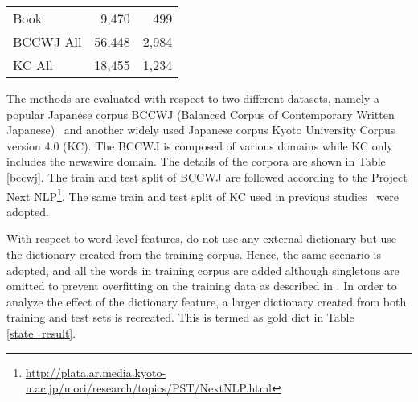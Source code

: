 \documentclass[11pt,letterpaper]{article}
\begin{document}
\begin{table}[t]
\begin{center}
\begin{tabular}{p{45mm} rr}
    Book& 9,470&499 \\
    BCCWJ All  &56,448 &2,984 \\  \hline
    KC All &18,455 & 1,234  \\                                                                                                                                                                                                                                                                                                                                                                   
    \bottomrule                                                                                                                                               
    \end{tabular}                                                                                                                                                                                                                                                                                                           
    \end{center}                                                                                                                                                                                                                                                                                                            
 \end{table}  

The methods are evaluated with respect to two different datasets, namely a popular Japanese corpus BCCWJ (Balanced Corpus of Contemporary Written Japanese)~\cite{maekawa2014balanced} and another widely used Japanese corpus Kyoto University Corpus version 4.0 (KC). 
The BCCWJ is composed of various domains while KC only includes the newswire domain. The details of the corpora are shown in Table \ref{bccwj}.  
The train and test split of BCCWJ are followed according to the Project Next NLP\footnote{\url{http://plata.ar.media.kyoto-u.ac.jp/mori/research/topics/PST/NextNLP.html}}. 
The same train and test split of KC used in previous studies~\cite{kudo-yamamoto-matsumoto:2004:EMNLP,uchimoto2001unknown} were adopted.

With respect to word-level features,
{} do not use any external dictionary but use the dictionary created from the training corpus. Hence, the same scenario is adopted, and all the words in training corpus are added although singletons are omitted to prevent overfitting on the training data as described in \cite{neubig-nakata-mori:2011:ACL-HLT2011}.
In order to analyze the effect of the dictionary feature, a larger dictionary created from both training and test sets is recreated. This is termed as gold dict in Table \ref{state_result}.
\end{document}
